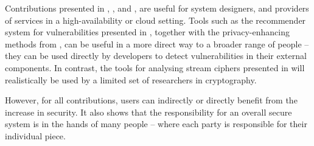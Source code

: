 Contributions presented in , , and , are useful for system designers, and providers of services in a high-availability or cloud setting.
Tools such as the recommender system for vulnerabilities presented in , together with the privacy-enhancing methods from , can be useful in a more direct way to a broader range of people -- they can be used directly by developers to detect vulnerabilities in their external components.
In contrast, the tools for analysing stream ciphers presented in  will realistically be used by a limited set of researchers in cryptography.

However, for all contributions, users can indirectly or directly benefit from the increase in security.
It also shows that the responsibility for an overall secure system is in the hands of many people -- where each party is responsible for their individual piece.

{ \raggedright
\printbibliography[segment=\therefsegment,heading=bibintoc]
}
